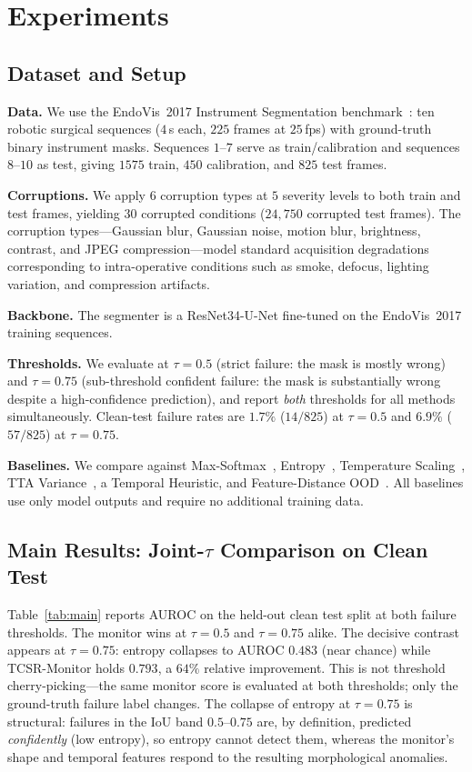 \documentclass[letterpaper, 10 pt, conference]{ieeeconf}  %
\newcommand{\monitor}{TCSR-Monitor}
\newcommand{\unet}{U-Net}
\begin{document}
\section{Experiments}

\subsection{Dataset and Setup}

\textbf{Data.} We use the EndoVis~2017 Instrument Segmentation
benchmark~\cite{ref:bodenstedt}: ten robotic surgical sequences ($4$\,s each,
$225$ frames at $25$\,fps) with ground-truth binary instrument masks.
Sequences $1$--$7$ serve as train/calibration and sequences $8$--$10$ as
test, giving $1575$ train, $450$ calibration, and $825$ test frames.

\textbf{Corruptions.} We apply $6$ corruption types at $5$ severity levels to
both train and test frames, yielding $30$ corrupted conditions
($24{,}750$ corrupted test frames). The corruption types---Gaussian blur,
Gaussian noise, motion blur, brightness, contrast, and JPEG
compression---model standard acquisition degradations corresponding to
intra-operative conditions such as smoke, defocus, lighting variation, and
compression artifacts.

\textbf{Backbone.} The segmenter is a ResNet34-\unet{} fine-tuned on the
EndoVis~2017 training sequences.

\textbf{Thresholds.} We evaluate at $\tau = 0.5$ (strict failure: the mask is
mostly wrong) and $\tau = 0.75$ (sub-threshold confident failure: the mask is
substantially wrong despite a high-confidence prediction), and report
\emph{both} thresholds for all methods simultaneously. Clean-test failure
rates are $1.7\%$ ($14/825$) at $\tau = 0.5$ and $6.9\%$ ($57/825$) at
$\tau = 0.75$.

\textbf{Baselines.} We compare against Max-Softmax~\cite{ref:hendrycks},
Entropy~\cite{ref:malinin}, Temperature Scaling~\cite{ref:guo}, TTA
Variance~\cite{ref:lakshmi}, a Temporal Heuristic, and Feature-Distance
OOD~\cite{ref:lee}. All baselines use only model outputs and require no
additional training data.

\subsection{Main Results: Joint-$\tau$ Comparison on Clean Test}

Table~\ref{tab:main} reports AUROC on the held-out clean test split at both
failure thresholds. The monitor wins at $\tau = 0.5$ and $\tau = 0.75$
alike. The decisive contrast appears at $\tau = 0.75$: entropy collapses to
AUROC $0.483$ (near chance) while \monitor{} holds $0.793$, a $64\%$ relative
improvement. This is not threshold cherry-picking---the same monitor score is
evaluated at both thresholds; only the ground-truth failure label changes.
The collapse of entropy at $\tau = 0.75$ is structural: failures in the
IoU band $0.5$--$0.75$ are, by definition, predicted \emph{confidently} (low
entropy), so entropy cannot detect them, whereas the monitor's shape and
temporal features respond to the resulting morphological anomalies.
\end{document}

